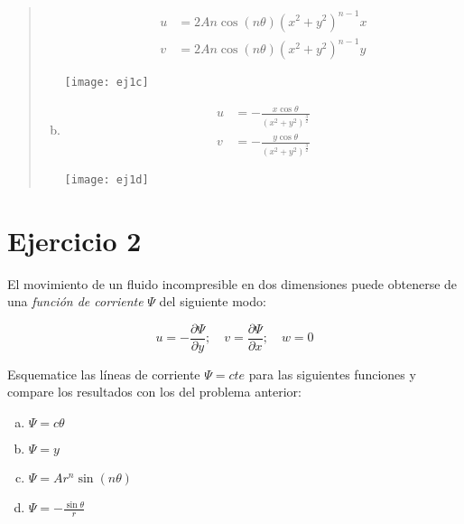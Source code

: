\documentclass[a4paper,10pt,twoside,final,spanish]{article}
\begin{document}
\begin{quote}
\begin{enumerate}[a)]
\begin{minipage}{0.5\linewidth}

\begin{align*}
u &= 2An\cos{(n\theta)}(x^{2}+y^{2})^{n-1}x \\
v &= 2An\cos{(n\theta)}(x^{2}+y^{2})^{n-1}y
\end{align*}

\end{minipage} \hfill \begin{minipage}{0.5\linewidth}

\texttt{[image: ej1c]}

\end{minipage}

\item

\begin{minipage}{0.5\linewidth}

\begin{align*}
u &= -\frac{x\cos{\theta}}{(x^{2}+y^{2})^{\frac{3}{2}}} \\
v &= -\frac{y\cos{\theta}}{(x^{2}+y^{2})^{\frac{3}{2}}}
\end{align*}

\end{minipage} \hfill \begin{minipage}{0.5\linewidth}

\texttt{[image: ej1d]}

\end{minipage}

\end{enumerate}
\end{quote}

\section*{Ejercicio 2}

El movimiento de un fluido incompresible en dos dimensiones puede obtenerse de una \textit{función de corriente} $\Psi$ del siguiente modo:

\[
u=-\frac{\partial\Psi}{\partial y}; \quad
v=\frac{\partial\Psi}{\partial x};  \quad
w=0
\]

Esquematice las líneas de corriente $\Psi=cte$ para las siguientes funciones y compare 
los resultados con los del problema anterior:

\begin{enumerate}[a)]
\item $\Psi=c\theta$
\item $\Psi=y$
\item $\Psi=Ar^{n}\sin(n\theta)$
\item $\displaystyle \Psi=-\frac{\sin\theta}{r}$
\end{enumerate}
\end{document}
